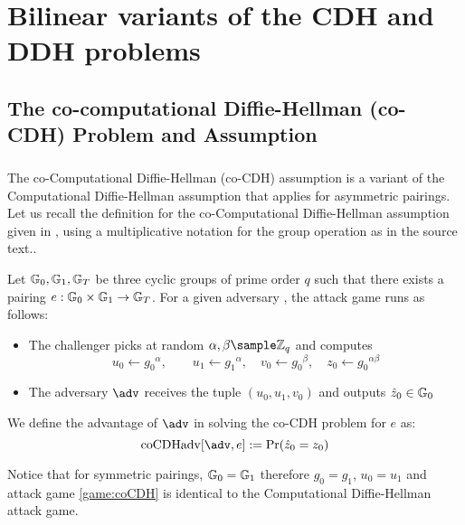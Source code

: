 
\appendix

\chapter{Bilinear variants of the CDH and DDH problems}
\label{ap:coCDH}

\section{The co-computational Diffie-Hellman (co-CDH) Problem and Assumption}

	\paragraph{} The co-Computational Diffie-Hellman (co-CDH) assumption is a variant of the Computational Diffie-Hellman assumption that applies for asymmetric pairings. Let us recall the definition for the co-Computational Diffie-Hellman assumption given in \cite{BonehShoup}, using a multiplicative notation for the group operation as in the source text.. 
	
	\begin{secgame}
	\label{game:coCDH}
		Let $\mathbb{G}_0, \mathbb{G}_1, \mathbb{G}_T$ be three cyclic groups of  prime order $q$ such that there exists a pairing $e : \mathbb{G}_0 \times \mathbb{G}_1 \rightarrow \mathbb{G}_T$. For a given adversary \adv, the attack game runs as follows:
			\begin{itemize}
				\item The challenger picks at random $\alpha,\beta \sample \mathbb{Z}_q$ and computes
				 $$
				 	u_0 \leftarrow {g_0}^\alpha, \quad\quad u_1 \leftarrow {g_1}^\alpha, \quad v_0 \leftarrow {g_0}^\beta, \quad z_0 \leftarrow {g_0}^{\alpha\beta}
				 $$
				\item The adversary $\adv$ receives the tuple $(u_0, u_1, v_0)$ and outputs $\hat z_0 \in \mathbb{G}_0$
						
			\end{itemize} 
	\end{secgame}
	
	\noindent We define the advantage of $\adv$ in solving the co-CDH problem for $e$ as:
	\begin{equation}
		\mathrm{coCDHadv}[\adv, e] := \mathrm{Pr}(\hat z_0 = z_0)
	\end{equation}
	
	\noindent Notice that for symmetric pairings, $\mathbb{G}_0 = \mathbb{G}_1$ therefore $g_0 = g_1 $, $u_0 = u_1$ and attack game \autoref{game:coCDH} is identical to the Computational Diffie-Hellman attack game.
	
